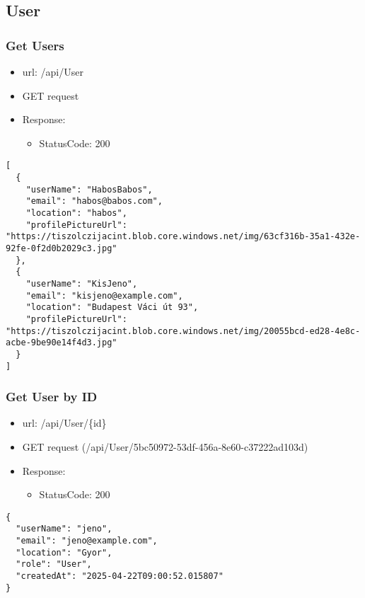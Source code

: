 \documentclass[11pt]{article}
\begin{document}
\subsection{User}
\label{sec:org036c3c4}
\subsubsection{Get Users}
\label{sec:org6e07bb7}
\begin{itemize}
\item url: /api/User
\item GET request
\item Response:
\begin{itemize}
\item StatusCode: 200
\end{itemize}
\end{itemize}
\begin{verbatim}
[
  {
    "userName": "HabosBabos",
    "email": "habos@babos.com",
    "location": "habos",
    "profilePictureUrl": "https://tiszolczijacint.blob.core.windows.net/img/63cf316b-35a1-432e-92fe-0f2d0b2029c3.jpg"
  },
  {
    "userName": "KisJeno",
    "email": "kisjeno@example.com",
    "location": "Budapest Váci út 93",
    "profilePictureUrl": "https://tiszolczijacint.blob.core.windows.net/img/20055bcd-ed28-4e8c-acbe-9be90e14f4d3.jpg"
  }
]
\end{verbatim}
\subsubsection{Get User by ID}
\label{sec:orgd67a1e4}
\begin{itemize}
\item url: /api/User/\{id\}
\item GET request (/api/User/5bc50972-53df-456a-8e60-c37222ad103d)
\item Response:
\begin{itemize}
\item StatusCode: 200
\end{itemize}
\end{itemize}
\begin{verbatim}
{
  "userName": "jeno",
  "email": "jeno@example.com",
  "location": "Gyor",
  "role": "User",
  "createdAt": "2025-04-22T09:00:52.015807"
}
\end{verbatim}
\end{document}
